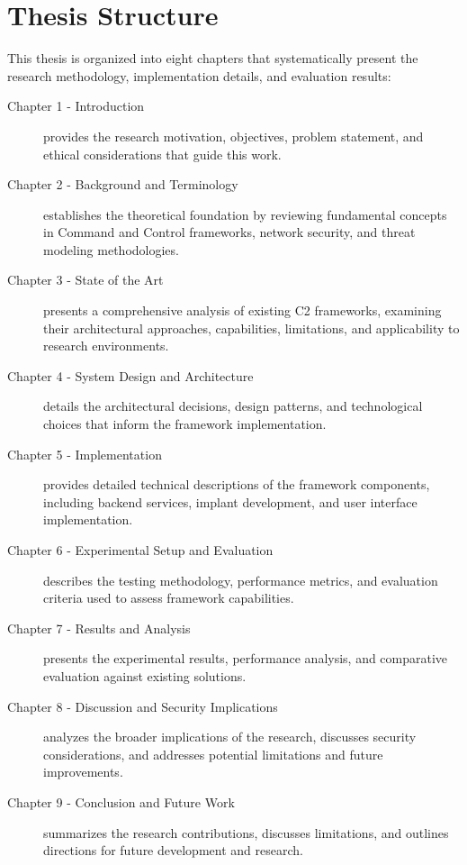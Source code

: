 \section{Thesis Structure}
\label{sec:structure}

This thesis is organized into eight chapters that systematically present the research methodology, implementation details, and evaluation results:
\begin{description}

\item[Chapter 1 - Introduction] provides the research motivation, objectives, problem statement, and ethical considerations that guide this work.

\item[Chapter 2 - Background and Terminology] establishes the theoretical foundation by reviewing fundamental concepts in Command and Control frameworks, network security, and threat modeling methodologies.

\item[Chapter 3 - State of the Art] presents a comprehensive analysis of existing C2 frameworks, examining their architectural approaches, capabilities, limitations, and applicability to research environments.

\item[Chapter 4 - System Design and Architecture] details the architectural decisions, design patterns, and technological choices that inform the framework implementation.

\item[Chapter 5 - Implementation] provides detailed technical descriptions of the framework components, including backend services, implant development, and user interface implementation.

\item[Chapter 6 - Experimental Setup and Evaluation] describes the testing methodology, performance metrics, and evaluation criteria used to assess framework capabilities.

\item[Chapter 7 - Results and Analysis] presents the experimental results, performance analysis, and comparative evaluation against existing solutions.

\item[Chapter 8 - Discussion and Security Implications] analyzes the broader implications of the research, discusses security considerations, and addresses potential limitations and future improvements.

\item[Chapter 9 - Conclusion and Future Work] summarizes the research contributions, discusses limitations, and outlines directions for future development and research.
\end{description}

